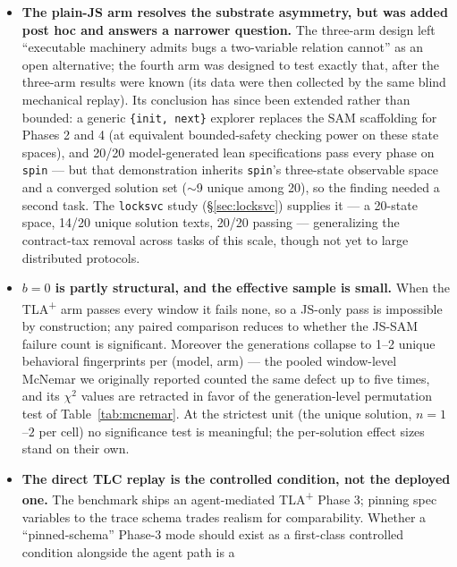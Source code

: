 \documentclass[11pt]{article}
\newcommand{\jssam}{JS-SAM}
\newcommand{\tlaplus}{TLA\texorpdfstring{\textsuperscript{+}}{+}}
\begin{document}
\begin{itemize}
  the shortfall is replay-contract incompatibility, not incorrect modeling
  --- so both numbers are reported, with the unconditional as headline.
  ``Contract first, prompt second'' thus refines to: \emph{the prompt
  matters exactly where the contract under-constrains}.
\item \textbf{The plain-JS arm resolves the substrate asymmetry, but was
  added post hoc and answers a narrower question.} The three-arm design left
  ``executable machinery admits bugs a two-variable relation cannot'' as an
  open alternative; the fourth arm was designed to test exactly that, after
  the three-arm results were known (its data were then collected by the same
  blind mechanical replay). Its conclusion has since been extended rather
  than bounded: a generic \texttt{\{init, next\}} explorer replaces the SAM
  scaffolding for Phases 2 and 4 (at equivalent bounded-safety checking
  power on these state spaces), and 20/20 model-generated lean
  specifications pass every phase on \texttt{spin} --- but that
  demonstration inherits \texttt{spin}'s three-state observable space and a
  converged solution set ($\sim$9 unique among 20), so the finding needed a
  second task. The \texttt{locksvc} study (\S\ref{sec:locksvc}) supplies it
  --- a 20-state space, 14/20 unique solution texts, 20/20 passing ---
  generalizing the contract-tax removal across tasks of this scale, though
  not yet to large distributed protocols.
\item \textbf{$b{=}0$ is partly structural, and the effective sample is
  small.} When the \tlaplus{} arm passes every window it fails none, so a
  JS-only pass is impossible by construction; any paired comparison reduces
  to whether the \jssam{} failure count is significant. Moreover the
  generations collapse to 1--2 unique behavioral fingerprints per (model,
  arm) --- the pooled window-level McNemar we originally reported counted the
  same defect up to five times, and its $\chi^2$ values are retracted in
  favor of the generation-level permutation test of
  Table~\ref{tab:mcnemar}. At the strictest unit (the unique solution,
  $n{=}1$--$2$ per cell) no significance test is meaningful; the
  per-solution effect sizes stand on their own.
\item \textbf{The direct TLC replay is the controlled condition, not the
  deployed one.} The benchmark ships an agent-mediated \tlaplus{} Phase 3;
  pinning spec variables to the trace schema trades realism for
  comparability. Whether a ``pinned-schema'' Phase-3 mode should exist as a
  first-class controlled condition alongside the agent path is a

\end{itemize}
\end{document}
